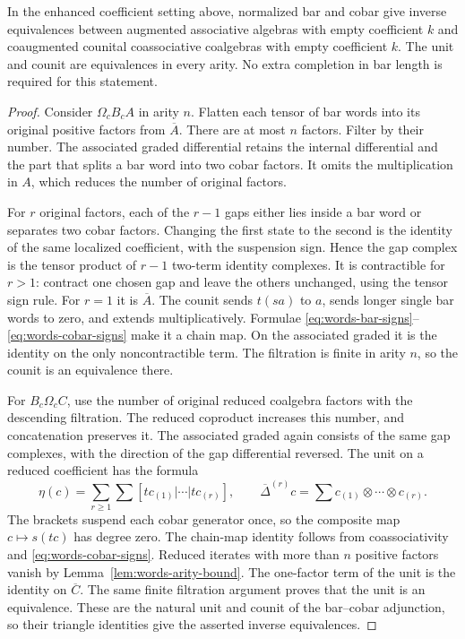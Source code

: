 \begin{theorem}
\label{thm:words-finite-duality}
In the enhanced coefficient setting above, normalized bar and cobar
give inverse equivalences between augmented associative algebras
with empty coefficient \(k\) and coaugmented counital coassociative
coalgebras with empty coefficient \(k\).  The unit and counit are
equivalences in every arity.  No extra completion in bar length is
required for this statement.
\end{theorem}
\begin{proof}
Consider \(\Omega_c B_c A\) in arity \(n\).  Flatten each tensor of
bar words into its original positive factors from \(\overline A\).
There are at most \(n\) factors.  Filter by their number.  The
associated graded differential retains the internal differential
and the part that splits a bar word into two cobar factors.  It
omits the multiplication in \(A\), which reduces the number of
original factors.

For \(r\) original factors, each of the \(r-1\) gaps either lies
inside a bar word or separates two cobar factors.  Changing the
first state to the second is the identity of the same localized
coefficient, with the suspension sign.  Hence the gap complex is
the tensor product of \(r-1\) two-term identity complexes.  It is
contractible for \(r>1\): contract one chosen gap and leave the
others unchanged, using the tensor sign rule.  For \(r=1\) it is
\(\overline A\).  The counit sends \(t(sa)\) to \(a\), sends longer
single bar words to zero, and extends multiplicatively.  Formulae
\eqref{eq:words-bar-signs}--\eqref{eq:words-cobar-signs} make it a
chain map.  On the associated graded it is the identity on the
only noncontractible term.  The filtration is finite in arity
\(n\), so the counit is an equivalence there.

For \(B_c\Omega_c C\), use the number of original reduced
coalgebra factors with the descending filtration.  The reduced
coproduct increases this number, and concatenation preserves it.
The associated graded again consists of the same gap complexes,
with the direction of the gap differential reversed.  The unit on a
reduced coefficient has the formula
\[
 \eta(c)=\sum_{r\geq1}\sum
 [tc_{(1)}|\cdots|tc_{(r)}],
 \qquad
 \overline\Delta^{(r)}c=
       \sum c_{(1)}\otimes\cdots\otimes c_{(r)}.
\]
The brackets suspend each cobar generator once, so the composite
map \(c\mapsto s(tc)\) has degree zero.  The chain-map identity
follows from coassociativity and \eqref{eq:words-cobar-signs}.
Reduced iterates with more than \(n\) positive factors vanish by
Lemma~\ref{lem:words-arity-bound}.  The one-factor term
of the unit is the identity on \(\overline C\).  The same finite
filtration argument proves that the unit is an equivalence.  These
are the natural unit and counit of the bar--cobar adjunction, so
their triangle identities give the asserted inverse equivalences.
\end{proof}

